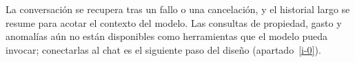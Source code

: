 La conversación se recupera tras un fallo o una cancelación, y el historial largo se resume para acotar el contexto del modelo. Las consultas de propiedad, gasto y anomalías aún no están disponibles como herramientas que el modelo pueda invocar; conectarlas al chat es el siguiente paso del diseño (apartado~\ref{i-0}).
